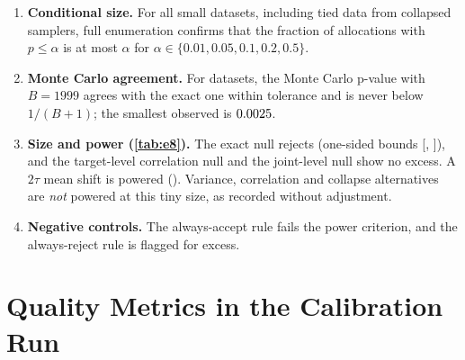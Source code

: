 \documentclass{article}
\theoremstyle{plain}
\theoremstyle{definition}
\theoremstyle{remark}
\begin{document}
\begin{enumerate}
\item \textbf{Conditional size.} For all \numEeightAdatasets{} small datasets, including tied data from collapsed samplers, full enumeration confirms that the fraction of allocations with $p\le\alpha$ is at most $\alpha$ for $\alpha\in\{0.01,0.05,0.1,0.2,0.5\}$.
\item \textbf{Monte Carlo agreement.} For \numEeightBdatasets{} datasets, the Monte Carlo p-value with $B=1999$ agrees with the exact one within tolerance and is never below $1/(B+1)$; the smallest observed is $0.0025$.
\item \textbf{Size and power (\cref{tab:e8}).} The exact null rejects \numEeightNullK{} (one-sided bounds [\numEeightNullLo, \numEeightNullHi]), and the target-level correlation null and the joint-level null show no excess. A $2\tau$ mean shift is powered (\numEeightShiftK). Variance, correlation and collapse alternatives are \emph{not} powered at this tiny size, as recorded without adjustment.
\item \textbf{Negative controls.} The always-accept rule fails the power criterion, and the always-reject rule is flagged for excess.
\end{enumerate}

\section{Quality Metrics in the Calibration Run}
\label{app:calibq}
\begin{table}[h]
\centering
\caption{Quality metrics in the calibration run: mean CRPS excess over the true conditional ($\times10^3$) for each branch, oracle sd ratio of the sequential branch, and the share of replicates whose 95\% CI for the sequential CRPS excess lies above $0$.}
\label{tab:calibq}
\scriptsize
\setlength{\tabcolsep}{3pt}

\end{table}
\end{document}
